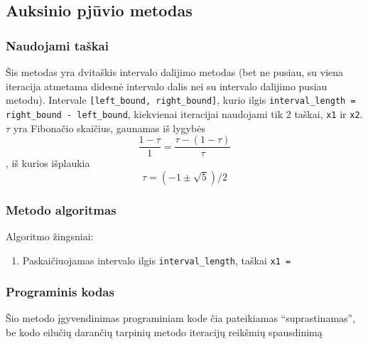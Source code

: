 \documentclass[lithuanian,a4paper,12pt]{article}
\newcommand{\mil}{\texttt}
\begin{document}
\pagebreak
\subsection{Auksinio pjūvio metodas}
\subsubsection*{Naudojami taškai}
Šis metodas yra dvitaškis intervalo dalijimo metodas (bet ne pusiau, su viena iteracija atmetama didesnė intervalo dalis nei su intervalo dalijimo pusiau metodu). Intervale \mil{[left_bound, right_bound]}, kurio ilgis \mil{interval_length = right_bound - left_bound}, kiekvienai iteracijai naudojami tik 2 taškai, \mil{x1} ir \mil{x2}. $\tau$ yra Fibonačio skaičius, gaunamas iš lygybės
\begin{equation*}
    \frac{1 - \tau}{1} = \frac{\tau - (1 - \tau)}{\tau}
\end{equation*}
, iš kurios išplaukia
\begin{equation*}
    \tau = (-1 \pm \sqrt{5}) / 2
\end{equation*}

\pagebreak
\subsubsection*{Metodo algoritmas}
Algoritmo žingsniai:
\begin{enumerate}
    \item Paskaičiuojamas intervalo ilgis \mil{interval_length}, taškai \mil{x1 = }
\end{enumerate}

\pagebreak
\subsubsection*{Programinis kodas}
Šio metodo įgyvendinimas programiniam kode čia pateikiamas ``suprastinamas'', be kodo eilučių darančių tarpinių metodo iteracijų reikšmių spausdinimą
\end{document}
